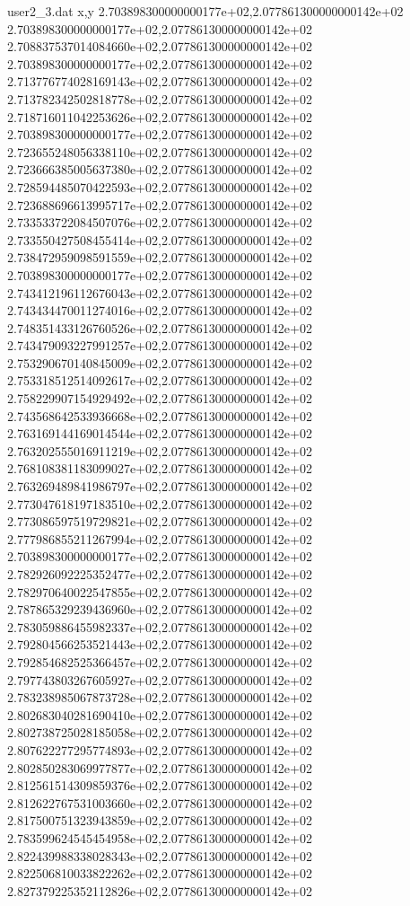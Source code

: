 \begin{filecontents}{user2_3.dat}
x,y
2.703898300000000177e+02,2.077861300000000142e+02
2.703898300000000177e+02,2.077861300000000142e+02
2.708837537014084660e+02,2.077861300000000142e+02
2.703898300000000177e+02,2.077861300000000142e+02
2.713776774028169143e+02,2.077861300000000142e+02
2.713782342502818778e+02,2.077861300000000142e+02
2.718716011042253626e+02,2.077861300000000142e+02
2.703898300000000177e+02,2.077861300000000142e+02
2.723655248056338110e+02,2.077861300000000142e+02
2.723666385005637380e+02,2.077861300000000142e+02
2.728594485070422593e+02,2.077861300000000142e+02
2.723688696613995717e+02,2.077861300000000142e+02
2.733533722084507076e+02,2.077861300000000142e+02
2.733550427508455414e+02,2.077861300000000142e+02
2.738472959098591559e+02,2.077861300000000142e+02
2.703898300000000177e+02,2.077861300000000142e+02
2.743412196112676043e+02,2.077861300000000142e+02
2.743434470011274016e+02,2.077861300000000142e+02
2.748351433126760526e+02,2.077861300000000142e+02
2.743479093227991257e+02,2.077861300000000142e+02
2.753290670140845009e+02,2.077861300000000142e+02
2.753318512514092617e+02,2.077861300000000142e+02
2.758229907154929492e+02,2.077861300000000142e+02
2.743568642533936668e+02,2.077861300000000142e+02
2.763169144169014544e+02,2.077861300000000142e+02
2.763202555016911219e+02,2.077861300000000142e+02
2.768108381183099027e+02,2.077861300000000142e+02
2.763269489841986797e+02,2.077861300000000142e+02
2.773047618197183510e+02,2.077861300000000142e+02
2.773086597519729821e+02,2.077861300000000142e+02
2.777986855211267994e+02,2.077861300000000142e+02
2.703898300000000177e+02,2.077861300000000142e+02
2.782926092225352477e+02,2.077861300000000142e+02
2.782970640022547855e+02,2.077861300000000142e+02
2.787865329239436960e+02,2.077861300000000142e+02
2.783059886455982337e+02,2.077861300000000142e+02
2.792804566253521443e+02,2.077861300000000142e+02
2.792854682525366457e+02,2.077861300000000142e+02
2.797743803267605927e+02,2.077861300000000142e+02
2.783238985067873728e+02,2.077861300000000142e+02
2.802683040281690410e+02,2.077861300000000142e+02
2.802738725028185058e+02,2.077861300000000142e+02
2.807622277295774893e+02,2.077861300000000142e+02
2.802850283069977877e+02,2.077861300000000142e+02
2.812561514309859376e+02,2.077861300000000142e+02
2.812622767531003660e+02,2.077861300000000142e+02
2.817500751323943859e+02,2.077861300000000142e+02
2.783599624545454958e+02,2.077861300000000142e+02
2.822439988338028343e+02,2.077861300000000142e+02
2.822506810033822262e+02,2.077861300000000142e+02
2.827379225352112826e+02,2.077861300000000142e+02

\end{filecontents}
